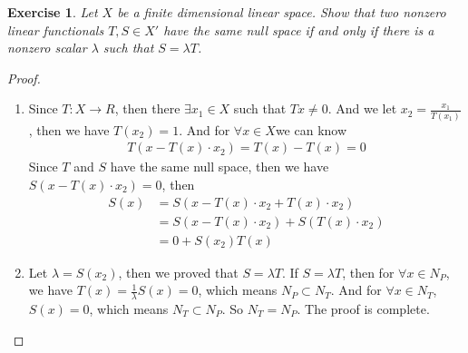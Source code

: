 \documentclass[11pt]{book}
\newtheorem{exercise}{Exercise}[section]
\theoremstyle{definition}
\numberwithin{equation}{chapter}
\begin{document}
\begin{exercise}
Let $X$ be a finite dimensional linear space. Show that two nonzero linear functionals $T,S\in X'$ have the same null space if and only if there is a nonzero scalar $\lambda$ such that $S = \lambda T$.
\end{exercise}
\begin{proof}
~\begin{enumerate}[label=(\alph*)]
    \item Since $T: X \rightarrow R$, then there $\exists x_1 \in X$ such that $T x \neq 0$. And we let $x_2  = \frac{x_1}{T(x_1)}$, then we have $T(x_2) = 1$. And for $\forall x \in X$we can know
    \begin{align*}
        T(x - T(x)\cdot x_2) = T(x) - T(x) = 0
    \end{align*}
    Since $T$ and $S$ have the same null space, then we have $S(x - T(x)\cdot x_2) = 0$, then 
    \begin{align*}
        S(x) & = S(x - T(x)\cdot x_2 + T(x)\cdot x_2) \\
        & = S(x - T(x)\cdot x_2) + S(T(x)\cdot x_2) \\
        & = 0 + S(x_2) T(x)
    \end{align*}
    \item Let $\lambda = S(x_2)$, then we proved that $S = \lambda T$.
    If $S = \lambda T$, then for $\forall x \in N_P$, we have $T(x) = \frac{1}{\lambda} S(x) = 0$, which means $N_P \subset N_T$. And for $\forall x \in N_T$, $S(x) = 0$, which means $N_T \subset N_P$. So $N_T = N_P$. The proof is complete.
\end{enumerate}
\end{proof}

\medskip
\end{document}

